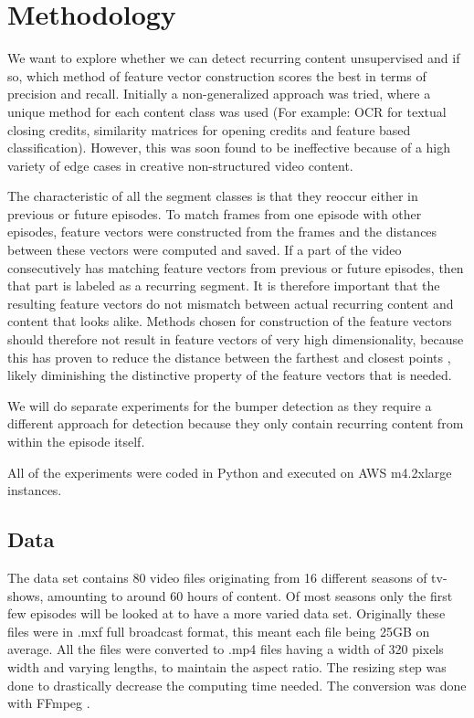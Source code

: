 \documentclass{article}
\begin{document}
\section{Methodology} \label{methodology}
We want to explore whether we can detect recurring content unsupervised and if so, which method of feature vector construction scores the best in terms of precision and recall. Initially a non-generalized approach was tried, where a unique method for each content class was used (For example: OCR for textual closing credits, similarity matrices for opening credits and feature based classification). However, this was soon found to be ineffective because of a high variety of edge cases in creative non-structured video content. 

The characteristic of all the segment classes is that they reoccur either in previous or future episodes. To match frames from one episode with other episodes, feature vectors were constructed from the frames and the distances between these vectors were computed and saved. If a part of the video consecutively has matching feature vectors from previous or future episodes, then that part is labeled as a recurring segment. It is therefore important that the resulting feature vectors do not mismatch between actual recurring content and content that looks alike. Methods chosen for construction of the feature vectors should therefore not result in feature vectors of very high dimensionality, because this has proven to reduce the distance between the farthest and closest points \cite{beyer1999nearest}, likely diminishing the distinctive property of the feature vectors that is needed.

We will do separate experiments for the bumper detection as they require a different approach for detection because they only contain recurring content from within the episode itself.

All of the experiments were coded in Python and executed on AWS m4.2xlarge instances.

\subsection{Data}
The data set contains 80 video files originating from 16 different seasons of tv-shows, amounting to around 60 hours of content. Of most seasons only the first few episodes will be looked at to have a more varied data set. Originally these files were in .mxf full broadcast format, this meant each file being 25GB on average. All the files were converted to .mp4 files having a width of 320 pixels width and varying lengths, to maintain the aspect ratio. The resizing step was done to drastically decrease the computing time needed. The conversion was done with FFmpeg \cite{ffmpeg}.
\end{document}
